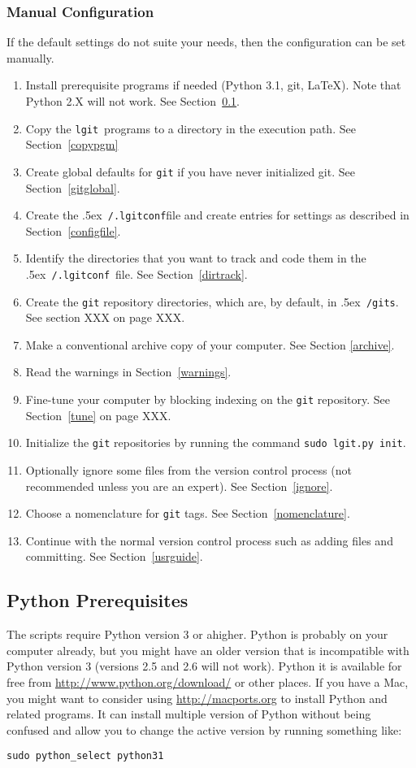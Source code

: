 \documentclass{ltxdoc}
\def\bobtilde{\lower.5ex\hbox{\tt \string~}}%
\def\ucmd#1{{\tt {#1}}}
\def\lgitconf{\bobtilde\ucmd{/.lgitconf}}
\def\lgit{{\tt lgit}}
\def\mygits{\bobtilde\ucmd{/gits}}
\begin{document}
\subsubsection{Manual Configuration}
If the default settings do not suite your needs, then the configuration can be set manually.
\begin{enumerate}
\item{Install prerequisite programs if needed (Python 3.1, git, \LaTeX).  Note     that Python 2.X will not work. See Section~\ref{pythpre}.}
\item{Copy the \lgit\ programs to a directory in the execution path. See     Section~\ref{copypgm}}
\item{Create global defaults for \ucmd{git} if you have never initialized git.     See Section~\ref{gitglobal}.}
\item{Create the \lgitconf file and create entries for settings as described     in Section~\ref{configfile}.}
\item{Identify the directories that you want to track and code them in the     \lgitconf \ file.  See Section~\ref{dirtrack}.}
\item{Create the \ucmd{git} repository directories, which are, by default, in   \mygits.  See section XXX on page XXX.}
\item{Make a conventional archive copy of your computer. See Section     \ref{archive}.}
\item{Read the warnings in Section~\ref{warnings}.}
\item{Fine-tune your computer by blocking indexing on the \ucmd{git}     repository. See Section~\ref{tune} on page XXX.}
\item{Initialize the \ucmd{git} repositories by running the command \ucmd{sudo       lgit.py init}.}
\item{Optionally ignore some files from the version control process (not     recommended unless you are an expert). See Section~\ref{ignore}.}
\item{Choose a nomenclature for \ucmd{git} tags. See Section~\ref{nomenclature}.}
\item{Continue with the normal version control process such as adding files     and committing.  See Section~\ref{usrguide}.}
\end{enumerate}

\subsection{Python Prerequisites}
\label{pythpre}The scripts require Python version 3 or ahigher.  Python is probably on your computer already, but you might have an older version that is incompatible with Python version 3 (versions 2.5 and 2.6 will not work). Python it is available for free from \url{http://www.python.org/download/} or other places.  If you have a Mac, you might want to consider using \url{http://macports.org} to install Python and related programs.  It can install multiple version of Python without being confused and allow you to change the active version by running something like:
\begin{verbatim}
sudo python_select python31
\end{verbatim}
\end{document}
